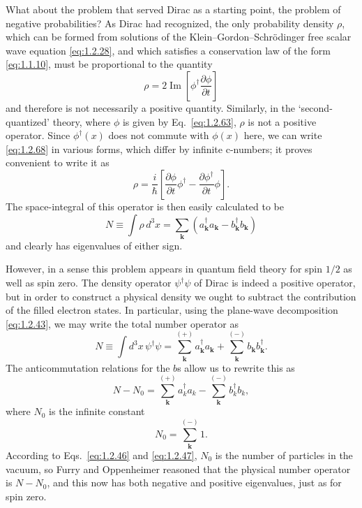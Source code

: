 What about the problem that served Dirac as a starting point, the problem of
negative probabilities? As Dirac had recognized, the only probability density
$\rho$, which can be formed from solutions of the
Klein--Gordon--Schr\"odinger free scalar wave equation \eqref{eq:1.2.28}, and which
satisfies a conservation law of the form \eqref{eq:1.1.10}, must be proportional to the
quantity
\begin{equation}
  \rho=2\mathop{\mathrm{Im}}\left[
    \phi^{\dagger}\frac{\partial\phi}{\partial t}\right]
  \tag{1.2.68}\label{eq:1.2.68}
\end{equation}
and therefore is not necessarily a positive quantity. Similarly, in the
`second-quantized' theory, where $\phi$ is given by Eq.~\eqref{eq:1.2.63}, $\rho$ is not
a positive operator. Since $\phi^{\dagger}(x)$ does not commute with $\phi(x)$
here, we can write \eqref{eq:1.2.68} in various forms, which differ by infinite
c-numbers; it proves convenient to write it as
\begin{equation}
  \rho=\frac{i}{\hbar}\left[
    \frac{\partial\phi}{\partial t}\phi^{\dagger}
    -\frac{\partial\phi^{\dagger}}{\partial t}\phi\right].
  \tag{1.2.69}\label{eq:1.2.69}
\end{equation}
The space-integral of this operator is then easily calculated to be
\begin{equation}
  N\equiv\int\rho\,d^3x
  =\sum_{\mathbf k}\left(
    a^{\dagger}_{\mathbf k}a_{\mathbf k}
    -b^{\dagger}_{\mathbf k}b_{\mathbf k}\right)
  \tag{1.2.70}\label{eq:1.2.70}
\end{equation}
and clearly has eigenvalues of either sign.

However, in a sense this problem appears in quantum field theory for spin
$1/2$ as well as spin zero. The density operator $\psi^{\dagger}\psi$ of
Dirac is indeed a positive operator, but in order to construct a physical
density we ought to subtract the contribution of the filled electron states.
In particular, using the plane-wave decomposition \eqref{eq:1.2.43}, we may write the
total number operator as
\[
  N\equiv\int d^3x\,\psi^{\dagger}\psi
  =\sum_{\mathbf k}^{(+)}a^{\dagger}_{\mathbf k}a_{\mathbf k}
   +\sum_{\mathbf k}^{(-)}b_{\mathbf k}b^{\dagger}_{\mathbf k}.
\]
The anticommutation relations for the $b$s allow us to rewrite this as
\begin{equation}
  N-N_0=\sum_{\mathbf k}^{(+)}a_k^{\dagger}a_k
    -\sum_{\mathbf k}^{(-)}b_k^{\dagger}b_k,
  \tag{1.2.71}\label{eq:1.2.71}
\end{equation}
where $N_0$ is the infinite constant
\begin{equation}
  N_0=\sum_{\mathbf k}^{(-)}1.
  \tag{1.2.72}\label{eq:1.2.72}
\end{equation}
According to Eqs.~\eqref{eq:1.2.46} and \eqref{eq:1.2.47}, $N_0$ is the number of particles in
the vacuum, so Furry and Oppenheimer reasoned that the physical number
operator is $N-N_0$, and this now has both negative and positive eigenvalues,
just as for spin zero.

